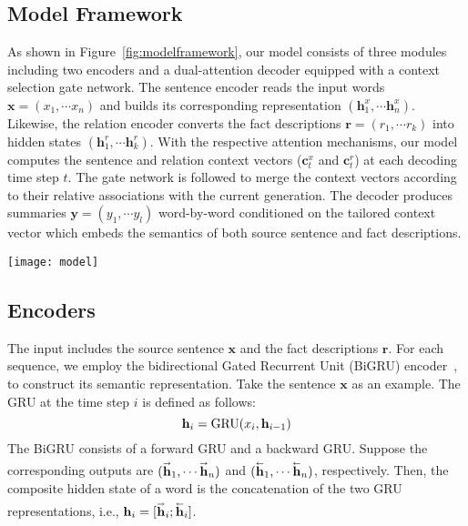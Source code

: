 \documentclass[letterpaper]{article} \usepackage{aaai18}  \usepackage{times}  \usepackage{helvet}  \usepackage{courier}  \usepackage{url}  \usepackage{graphicx}  \usepackage{amsfonts}
\begin{document}
	\subsection{Model Framework}
	As shown in Figure~\ref{fig:modelframework}, our model consists of three modules including two encoders and a dual-attention decoder equipped with a context selection gate network.
	The sentence encoder reads the input words
	${\mathbf{x}} = ({x_1}, \cdots {x_n})$ and builds its corresponding representation $({\mathbf{h}_1^x}, \cdots \mathbf{h}_n^x)$. 
	Likewise, the relation encoder converts the fact descriptions ${\mathbf{r}} = ({r_1}, \cdots {r_k})$ into hidden states $({\mathbf{h}_1^r}, \cdots \mathbf{h}_k^r)$.
	With the respective attention mechanisms, our model computes the sentence and relation context vectors ($\mathbf{c}_t^x$ and $\mathbf{c}_t^r$) at each decoding time step $t$.
	The gate network is followed to merge the context vectors according to their relative associations with the current generation.
	The decoder produces summaries ${\mathbf{y}} = ({y_1}, \cdots {y_l})$ word-by-word conditioned on the tailored context vector which embeds the semantics of both source sentence and fact descriptions.
	
	
	\begin{figure*}
		\centering
		\texttt{[image: model]}
		\caption{Model framework}
		\label{fig:modelframework}
	\end{figure*}
	
	
	\subsection{Encoders}
	The input includes the source sentence $\mathbf{x}$ and the fact descriptions $\mathbf{r}$.
	For each sequence, we employ the bidirectional Gated Recurrent Unit (BiGRU) encoder~\cite{cho2014learning}, to construct its semantic representation.
	Take the sentence $\mathbf{x}$ as an example.
	The GRU at the time step $i$ is defined as follows:
\begin{equation}\label{eq:GRU}
		{{\bf{h}}_i} = {\text{GRU}}({x_i},{{\bf{h}}_{i - 1}})
	\end{equation}
The BiGRU consists of a forward GRU and a backward GRU. 
	Suppose the corresponding outputs are $({{\mathbf{\overset{\lower0.5em\hbox{$\smash{\scriptscriptstyle\rightarrow}$}}{h} }}_1}, \cdots {{\mathbf{\overset{\lower0.5em\hbox{$\smash{\scriptscriptstyle\rightarrow}$}}{h} }}_n})$ and $({{\mathbf{\overset{\lower0.5em\hbox{$\smash{\scriptscriptstyle\leftarrow}$}}{h} }}_1}, \cdots {{\mathbf{\overset{\lower0.5em\hbox{$\smash{\scriptscriptstyle\leftarrow}$}}{h} }}_n})$, respectively.
	Then, the composite hidden state of a word is the concatenation of the two GRU representations, i.e., ${{\mathbf{h}}_i} = [{{\mathbf{\overset{\lower0.5em\hbox{$\smash{\scriptscriptstyle\rightarrow}$}}{h} }}_i};{{\mathbf{\overset{\lower0.5em\hbox{$\smash{\scriptscriptstyle\leftarrow}$}}{h} }}_i}]$.
	
\end{document}
